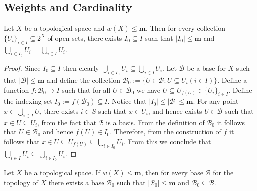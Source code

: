 \subsection{Weights and Cardinality}

\begin{proposition}\label{prop: weight m space subset union}
  Let \(X\) be a topological space and \(w(X) \leq \mathbf m\). Then for every
  collection \(\{U_i\}_{i \in I} \subseteq 2^X\) of open sets, there exists
  \(I_0 \subseteq I\) such that \(|I_0| \leq \mathbf m\) and \(\bigcup_{i \in
  I_0} U_i = \bigcup_{i \in  I} U_i\).
\end{proposition}

\begin{proof}
  Since \(I_0 \subseteq I\) then clearly \(\bigcup_{i \in  I_0} U_i \subseteq
  \bigcup_{i \in  I} U_i\). Let \(\mathcal B\) be a base for \(X\) such that
  \(|\mathcal B| \leq \mathbf m\) and define the collection \(\mathcal B_0 :=
  \{U \in \mathcal B : U \subseteq U_i (i \in I)\}\). Define a function \(f:
  \mathcal B_0 \to I\) such that for all \(U \in \mathcal B_0\) we have \(U
  \subseteq  U_{f(U)} \in \{U_i\}_{i \in I}\). Define the indexing set \(I_0 :=
  f(\mathcal B_0) \subseteq I\). Notice that \(|I_0| \leq |\mathcal B| \leq
  \mathbf m\). For any point \(x \in \bigcup_{i \in  I} U_i\) there exists \(i
  \in S\) such that \(x \in U_i\), and hence exists \(U \in \mathcal B\) such
  that \(x \in U \subseteq U_i\), from the fact that \(\mathcal B\) is a basis.
  From the definition of \(\mathcal B_0\) it follows that \(U \in \mathcal B_0\)
  and hence \(f(U) \in I_0\). Therefore, from the construction of \(f\) it
  follows that \(x \in U \subseteq U_{f(U)} \subseteq \bigcup_{i \in  I_0}
  U_i\). From this we conclude that \(\bigcup_{i \in  I} U_i \subseteq
  \bigcup_{i \in  I_0} U_i\).
\end{proof}

\begin{proposition}
  Let \(X\) be a topological space. If \(w(X) \leq \mathbf m\), then for every base
  \(\mathcal B\) for the topology of \(X\) there exists a base \(\mathcal B_0\)
  such that \(|\mathcal B_0| \leq \mathbf m\) and \(\mathcal B_0 \subseteq
  \mathcal B\).
\end{proposition}

